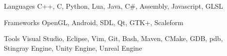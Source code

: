 


\begin{cvskills}


\cvskill
{Languages} %
{C++, C, Python, Lua, Java, C\#, Assembly, Javascript, GLSL } %

\cvskill
{Frameworks}
{OpenGL, Android, SDL, Qt, GTK+, Scaleform}

\cvskill
{Tools}
{Visual Studio, Eclipse, Vim, Git, Bash, Maven, CMake, GDB, pdb, Stingray Engine, Unity Engine, Unreal Engine}



\end{cvskills}
